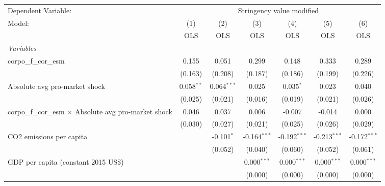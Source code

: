 
\begingroup
\centering
\begin{tabular}{lcccccc}
   \toprule
   Dependent Variable: & \multicolumn{6}{c}{Stringency value modified}\\
   Model:                                                        & (1)          & (2)           & (3)            & (4)            & (5)            & (6)\\  
                                                                 &  OLS         & OLS           & OLS            & OLS            & OLS            & OLS\\  
   \midrule
   \emph{Variables}\\
   corpo\_f\_cor\_esm                                            & 0.155        & 0.051         & 0.299          & 0.148          & 0.333          & 0.289\\   
                                                                 & (0.163)      & (0.208)       & (0.187)        & (0.186)        & (0.199)        & (0.226)\\   
   Absolute avg pro-market shock                                 & 0.058$^{**}$ & 0.064$^{***}$ & 0.025          & 0.035$^{*}$    & 0.023          & 0.040\\   
                                                                 & (0.025)      & (0.021)       & (0.016)        & (0.019)        & (0.021)        & (0.026)\\   
   corpo\_f\_cor\_esm $\times$ Absolute avg pro-market shock     & 0.046        & 0.037         & 0.006          & -0.007         & -0.014         & 0.000\\   
                                                                 & (0.030)      & (0.027)       & (0.021)        & (0.025)        & (0.026)        & (0.029)\\   
   CO2 emissions per capita                                      &              & -0.101$^{*}$  & -0.164$^{***}$ & -0.192$^{***}$ & -0.213$^{***}$ & -0.172$^{***}$\\   
                                                                 &              & (0.052)       & (0.040)        & (0.060)        & (0.052)        & (0.061)\\   
   GDP per capita (constant 2015 US\$)                           &              &               & 0.000$^{***}$  & 0.000$^{***}$  & 0.000$^{***}$  & 0.000$^{***}$\\   
                                                                 &              &               & (0.000)        & (0.000)        & (0.000)        & (0.000)\\   

\end{tabular}
